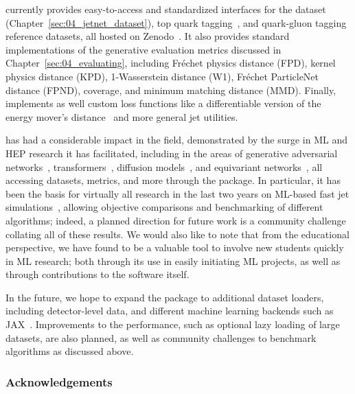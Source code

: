 \jetnet currently provides easy-to-access and standardized interfaces for the \jetnet dataset (Chapter~\ref{sec:04_jetnet_dataset}), top quark tagging~\cite{kasieczka_gregor_2019_2603256, Kasieczka:2019dbj}, and quark-gluon tagging~\cite{komiske_patrick_2019_3164691} reference datasets, all hosted on Zenodo~\cite{Zenodo}.
It also provides standard implementations of the generative evaluation metrics discussed in Chapter~\ref{sec:04_evaluating}, including Fr\'echet physics distance (FPD), kernel physics distance (KPD), 1-Wasserstein distance (W1), Fr\'echet ParticleNet distance (FPND), coverage, and minimum matching distance (MMD).
Finally, \jetnet implements as well custom loss functions like a differentiable version of the energy mover's distance~\cite{Komiske:2019fks} and more general jet utilities.

\jetnet has had a considerable impact in the field, demonstrated by the surge in ML and HEP research it has facilitated, including in the areas of generative adversarial networks~\cite{Kansal:2021cqp}, transformers~\cite{Kach:2022uzq, Kansal:2022spb, Kach:2023rqw},  diffusion models~\cite{Leigh:2023toe, Mikuni:2023dvk}, and equivariant networks~\cite{Hao:2022zns, Buhmann:2023pmh}, all accessing datasets, metrics, and more through the package.
In particular, it has been the basis for virtually all research in the last two years on ML-based fast jet simulations~\cite{Kansal:2021cqp, Kach:2022uzq, Kansal:2022spb, Kach:2023rqw, Leigh:2023toe, Mikuni:2023dvk}, allowing objective comparisons and benchmarking of different algorithms; indeed, a planned direction for future work is a \jetnet community challenge collating all of these results.
We would also like to note that from the educational perspective, we have found \jetnet to be a valuable tool to involve new students quickly in ML research;
both through its use in easily initiating ML projects, as well as through contributions to the software itself.

In the future, we hope to expand the package to additional dataset loaders, including detector-level data, and different machine learning backends such as JAX~\cite{jax2018github}.
Improvements to the performance, such as optional lazy loading of large datasets, are also planned, as well as community challenges to benchmark algorithms as discussed above.

\subsubsection{Acknowledgements}

